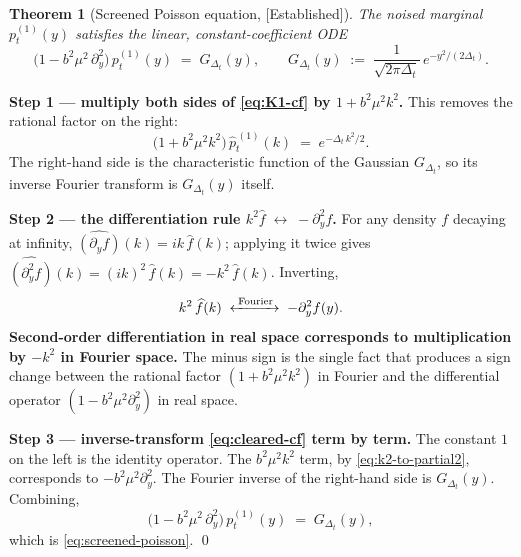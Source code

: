 \documentclass[11pt]{article}
\newtheorem{theorem}[proposition]{Theorem}
\theoremstyle{definition}
\newcommand{\Detl}{\Delta_t}
\newcommand{\Established}{\textcolor{black!50!green}{\textsf{[Established]}}}
\begin{document}
\begin{theorem}[Screened Poisson equation, \Established]\label{thm:screened-poisson}
The noised marginal \(p_t^{(1)}(y)\) satisfies the linear,
constant-coefficient ODE
\begin{equation}\label{eq:screened-poisson}
    \bigl(1 - b^2 \mu^2\, \partial_y^2\bigr)\, p_t^{(1)}(y)
    \;=\; G_{\Detl}(y),
    \qquad
    G_{\Detl}(y) \;:=\; \frac{1}{\sqrt{2 \pi \Detl}}\,
                         e^{-y^2 / (2 \Detl)}.
\end{equation}
\end{theorem}

\begin{derivation}
\textbf{Step 1 --- multiply both sides of \eqref{eq:K1-cf} by
\(1 + b^2 \mu^2 k^2\).} This removes the rational factor on the right:
\begin{equation}\label{eq:cleared-cf}
    \bigl(1 + b^2 \mu^2 k^2\bigr)\, \widehat p_t^{\,(1)}(k)
    \;=\; e^{- \Detl\, k^2 / 2}.
\end{equation}
The right-hand side is the characteristic function of the Gaussian
\(G_{\Detl}\), so its inverse Fourier transform is \(G_{\Detl}(y)\)
itself.

\textbf{Step 2 --- the differentiation rule \(k^2 \widehat f
\;\leftrightarrow\; -\partial_y^2 f\).} For any density \(f\) decaying
at infinity,
\(\widehat{(\partial_y f)}(k) = i k\, \widehat f(k)\); applying it
twice gives
\(\widehat{(\partial_y^2 f)}(k) = (i k)^2\, \widehat f(k) = - k^2\,
\widehat f(k)\). Inverting,
\begin{equation}\label{eq:k2-to-partial2}
    k^2\, \widehat f(k)
    \;\xleftrightarrow{\;\text{Fourier}\;}\;
    - \partial_y^2 f(y).
\end{equation}
\textbf{Second-order differentiation in real space corresponds to
multiplication by \(-k^2\) in Fourier space.} The minus sign is the
single fact that produces a sign change between the rational factor
\((1 + b^2 \mu^2 k^2)\) in Fourier and the differential operator
\((1 - b^2 \mu^2 \partial_y^2)\) in real space.

\textbf{Step 3 --- inverse-transform \eqref{eq:cleared-cf}
term by term.} The constant \(1\) on the left is the identity
operator. The \(b^2 \mu^2 k^2\) term, by \eqref{eq:k2-to-partial2},
corresponds to \(- b^2 \mu^2 \partial_y^2\). The Fourier inverse of
the right-hand side is \(G_{\Detl}(y)\). Combining,
\begin{equation}
    \bigl(1 - b^2 \mu^2\, \partial_y^2\bigr)\, p_t^{(1)}(y)
    \;=\; G_{\Detl}(y),
\end{equation}
which is \eqref{eq:screened-poisson}. \qed
\end{derivation}
\end{document}
